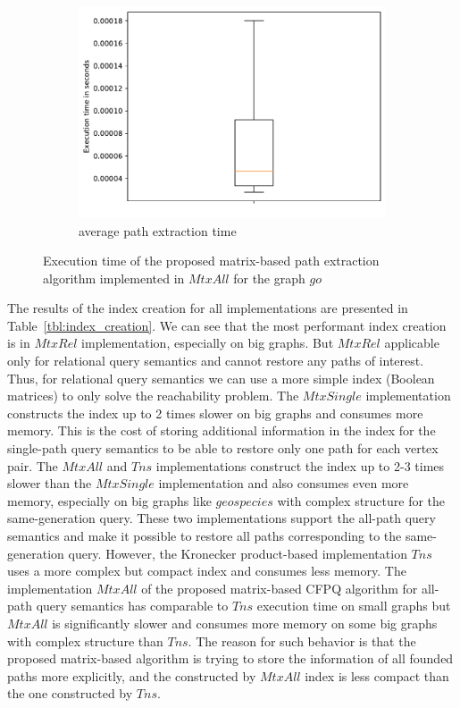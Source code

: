 \begin{figure}
\begin{subfigure}{0.32\textwidth}
		\includegraphics[width=\linewidth,trim=0 0 -1.5cm 0]{pictures/go_10_all_matrixall.pdf}
		\caption{average path extraction time} \label{fig:extractTimeGoAverageMtx}
	\end{subfigure}
	
	\caption{Execution time of the proposed matrix-based path extraction algorithm implemented in $MtxAll$ for the graph $go$}
	\label{fig:extractTimeMtx}
\end{figure}

The results of the index creation for all implementations are presented in Table~\ref{tbl:index_creation}. We can see that the most performant index creation is in $MtxRel$ implementation, especially on big graphs. But $MtxRel$ applicable only for relational query semantics  and cannot restore any paths of interest. Thus, for relational query semantics we can use a more simple index (Boolean matrices) to only solve the reachability problem. The $MtxSingle$ implementation constructs the index up to 2 times slower on big graphs and consumes more memory. This is the cost of storing additional information in the index for the single-path query semantics to be able to restore only one path for each vertex pair. The $MtxAll$ and $Tns$ implementations construct the index up to 2-3 times slower than the $MtxSingle$ implementation and also consumes even more memory, especially on big graphs like $geospecies$ with complex structure for the same-generation query. These two implementations support the all-path query semantics and make it possible to restore all paths corresponding to the same-generation query. However, the Kronecker product-based implementation $Tns$ uses a more complex but compact index and consumes less memory. The implementation $MtxAll$ of the proposed matrix-based CFPQ algorithm for all-path query semantics has comparable to $Tns$ execution time on small graphs but $MtxAll$ is significantly slower and consumes more memory on some big graphs with complex structure than $Tns$. The reason for such behavior is that the proposed matrix-based algorithm is trying to store the information of all founded paths more explicitly, and the constructed by $MtxAll$ index is less compact than the one constructed by $Tns$.

